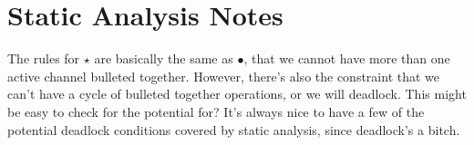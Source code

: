 \documentclass{article}
\begin{document}
\section{Static Analysis Notes}

The rules for $\star$ are basically the same as $\bullet$, that we cannot have more than one active channel bulleted together. However, there's also the constraint that we can't have a cycle of bulleted together operations, or we will deadlock. This might be easy to check for the potential for? It's always nice to have a few of the potential deadlock conditions covered by static analysis, since deadlock's a bitch.
\end{document}
